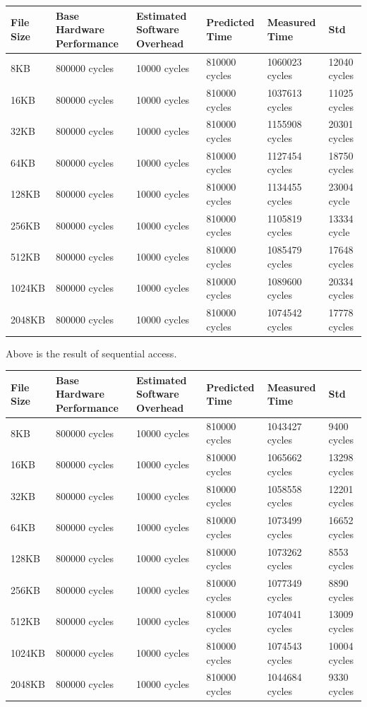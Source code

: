 \begin{center}
\begin{tabular}{| p{2cm} | p{2.5cm} | p{2.5cm} | p{2.5cm} | p{2.5cm} | p{3cm} }
File Size  & Base Hardware Performance  & Estimated Software Overhead  & Predicted Time  & Measured Time  & Std \\
\hline
8KB & 800000 cycles& 10000 cycles& 810000 cycles& 1060023 cycles & 12040 cycles \\ 
16KB & 800000 cycles& 10000 cycles& 810000 cycles& 1037613 cycles & 11025 cycles\\ 
32KB & 800000 cycles& 10000 cycles& 810000 cycles& 1155908 cycles & 20301 cycles\\
64KB & 800000 cycles& 10000 cycles& 810000 cycles& 1127454 cycles & 18750 cycles\\
128KB & 800000 cycles& 10000 cycles& 810000 cycles& 1134455 cycles & 23004 cycle \\
256KB & 800000 cycles& 10000 cycles& 810000 cycles& 1105819 cycles & 13334 cycle \\
512KB & 800000 cycles& 10000 cycles& 810000 cycles& 1085479 cycles & 17648 cycles\\
1024KB & 800000 cycles& 10000 cycles& 810000 cycles& 1089600 cycles & 20334 cycles\\
2048KB & 800000 cycles& 10000 cycles& 810000 cycles& 1074542 cycles & 17778 cycles \\

\end{tabular}
\end{center}

Above is the result of sequential access.

\begin{center}
\begin{tabular}{| p{2cm} | p{2.5cm} | p{2.5cm} | p{2.5cm} | p{2.5cm} | p{3cm} }
File Size  & Base Hardware Performance  & Estimated Software Overhead  & Predicted Time  & Measured Time  & Std \\
\hline
8KB & 800000 cycles& 10000 cycles& 810000 cycles& 1043427 cycles & 9400 cycles\\ 
16KB & 800000 cycles& 10000 cycles& 810000 cycles& 1065662 cycles & 13298 cycles\\ 
32KB & 800000 cycles& 10000 cycles& 810000 cycles& 1058558 cycles & 12201 cycles\\
64KB & 800000 cycles& 10000 cycles& 810000 cycles& 1073499 cycles & 16652 cycles\\
128KB & 800000 cycles& 10000 cycles& 810000 cycles& 1073262 cycles & 8553 cycles\\
256KB & 800000 cycles& 10000 cycles& 810000 cycles& 1077349 cycles & 8890 cycles\\
512KB & 800000 cycles& 10000 cycles& 810000 cycles& 1074041 cycles & 13009 cycles\\
1024KB & 800000 cycles& 10000 cycles& 810000 cycles& 1074543 cycles & 10004 cycles\\
2048KB & 800000 cycles& 10000 cycles& 810000 cycles& 1044684 cycles & 9330 cycles\\

\end{tabular}
\end{center}

